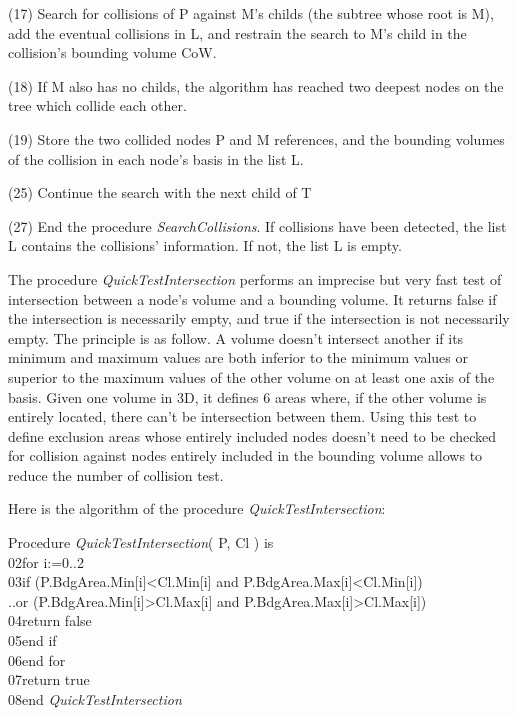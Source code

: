 \documentclass[12pt, a4paper]{article}
\begin{document}
(17) Search for collisions of P against M's childs (the subtree whose root is M), add the eventual collisions in L, and restrain the search to M's child in the collision's bounding volume CoW.

(18) If M also has no childs, the algorithm has reached two deepest nodes on the tree which collide each other.

(19) Store the two collided nodes P and M references, and the bounding volumes of the collision in each node's basis in the list L.

(25) Continue the search with the next child of T

(27) End the procedure {\em SearchCollisions}. If collisions have been detected, the list L contains the collisions' information. If not, the list L is empty.
\vspace{1.0em}

The procedure {\em QuickTestIntersection} performs an imprecise but very fast test of intersection between a node's volume and a bounding volume. It returns false if the intersection is necessarily empty, and true if the intersection is not necessarily empty. The principle is as follow. A volume doesn't intersect another if its minimum and maximum values are both inferior to the minimum values or superior to the maximum values of the other volume on at least one axis of the basis. Given one volume in 3D, it defines 6 areas where, if the other volume is entirely located, there can't be intersection between them. Using this test to define exclusion areas whose entirely included nodes doesn't need to be checked for collision against nodes entirely included in the bounding volume allows to reduce the number of collision test. 

Here is the algorithm of the procedure {\em QuickTestIntersection}:\\

\begin{ttfamily}
\quad Procedure {\em QuickTestIntersection}( P, Cl ) is\\
02\quad\quad for i:=0..2\\
03\quad\quad\quad if (P.BdgArea.Min[i]<Cl.Min[i] and P.BdgArea.Max[i]<Cl.Min[i])\\
..\quad\quad\quad\quad or (P.BdgArea.Min[i]>Cl.Max[i] and P.BdgArea.Max[i]>Cl.Max[i])\\
04\quad\quad\quad\quad\quad return false\\
05\quad\quad\quad end if\\
06\quad\quad end for\\
07\quad\quad return true\\
08\quad end {\em QuickTestIntersection}\\
\end{ttfamily}
\end{document}
